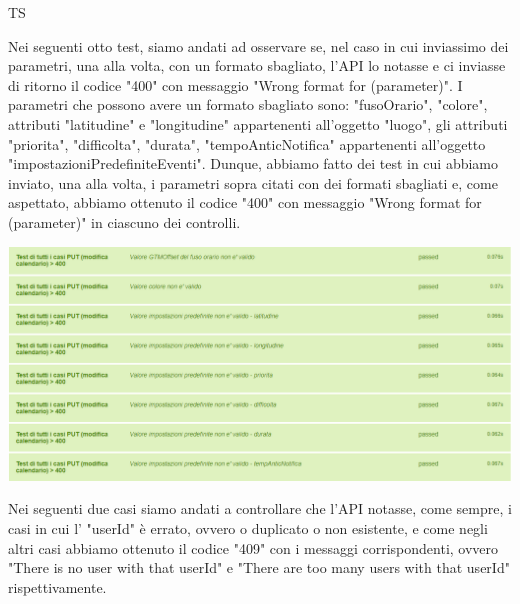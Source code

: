 \begin{listaPersonale}{TS}
\begin{center}
                \end{center}
                Nei seguenti otto test, siamo andati ad osservare se, nel caso in cui inviassimo dei parametri, una alla volta, con un formato sbagliato, l'API lo notasse e ci inviasse di ritorno il codice "400" con messaggio  "Wrong format for (parameter)". I parametri che possono avere un formato sbagliato sono: "fusoOrario", "colore", attributi "latitudine" e "longitudine" appartenenti all'oggetto "luogo", gli attributi "priorita", "difficolta", "durata", "tempoAnticNotifica" appartenenti all'oggetto "impostazioniPredefiniteEventi". Dunque, abbiamo fatto dei test in cui abbiamo inviato, una alla volta, i parametri sopra citati con dei formati sbagliati e, come aspettato, abbiamo ottenuto il codice "400" con messaggio "Wrong format for (parameter)" in ciascuno dei controlli.
                \begin{center}
                        \includegraphics[width=1\textwidth, height=0.30\textheight]{img/png/tests/CalendarioPut/400_wrongFormat_PutCalendario.png}
                \end{center}
                Nei seguenti due casi siamo andati a controllare che l'API notasse, come sempre, i casi in cui l' "userId" è errato, ovvero o duplicato o non esistente, e come negli altri casi abbiamo ottenuto il codice "409" con i messaggi corrispondenti, ovvero "There is no user with that userId" e "There are too many users with that userId" rispettivamente.

\end{listaPersonale}

